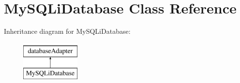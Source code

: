 \hypertarget{class_my_s_q_li_database}{
\section{MySQLiDatabase Class Reference}
\label{class_my_s_q_li_database}
}
Inheritance diagram for MySQLiDatabase:\begin{figure}[H]
\begin{center}
\leavevmode
\includegraphics[height=2.000000cm]{class_my_s_q_li_database}
\end{center}
\end{figure}
